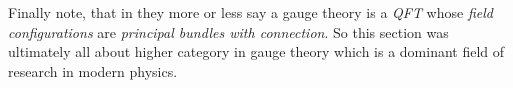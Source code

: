 \\\\
Finally note, that in \cite{wiki-nlab0000} they more or less say a gauge theory is a \textit{QFT} whose \textit{field configurations} are \textit{principal bundles with connection}. So this section was ultimately all about higher category in gauge theory which is a dominant field of research in modern physics.
